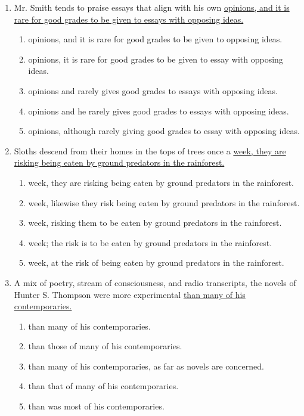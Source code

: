 \begin{enumerate}
\bigskip
\item Mr. Smith tends to praise essays that align with his own \ul{opinions, and it is rare for good grades to be given to essays with opposing ideas.}
\begin{enumerate}[label=(\Alph*)]
\item opinions, and it is rare for good grades to be given to opposing ideas.
\item opinions, it is rare for good grades to be given to essay with opposing ideas.
\item opinions and rarely gives good grades to essays with opposing ideas.
\item opinions and he rarely gives good grades to essays with opposing ideas.
\item opinions, although rarely giving good grades to essay with opposing ideas.
\end{enumerate}

\newpage
\item Sloths descend from their homes in the tops of trees once a \ul{week, they are risking being eaten by ground predators in the rainforest.}
\begin{enumerate}[label=(\Alph*)]
\item week, they are risking being eaten by ground predators in the rainforest.
\item week, likewise they risk being eaten by ground predators in the rainforest.
\item week, risking them to be eaten by ground predators in the rainforest.
\item week; the risk is to be eaten by ground predators in the rainforest.
\item week, at the risk of being eaten by ground predators in the rainforest.
\end{enumerate}

\bigskip
\item A mix of poetry, stream of consciousness, and radio transcripts, the novels of Hunter S. Thompson were more experimental \underline{than many of his contemporaries.}
\begin{enumerate}[label=(\Alph*)]
\item than many of his contemporaries.
\item than those of many of his contemporaries.
\item than many of his contemporaries, as far as novels are concerned.
\item than that of many of his contemporaries.
\item than was most of his contemporaries.
\end{enumerate}


\end{enumerate}
